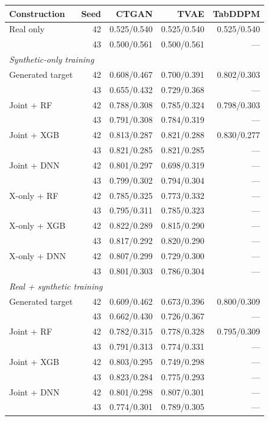 \begin{table}[ht]
\centering
{\small
\setlength{\tabcolsep}{2pt}
\begin{tabular}{lrrrr}
\toprule
Construction & Seed & CTGAN & TVAE & TabDDPM \\
\midrule
Real only & 42 & 0.525/0.540 & 0.525/0.540 & 0.525/0.540 \\
 & 43 & 0.500/0.561 & 0.500/0.561 & --- \\
\midrule
\multicolumn{5}{l}{\textit{Synthetic-only training}} \\
Generated target & 42 & 0.608/0.467 & 0.700/0.391 & 0.802/0.303 \\
 & 43 & 0.655/0.432 & 0.729/0.368 & --- \\
Joint + RF & 42 & 0.788/0.308 & 0.785/0.324 & 0.798/0.303 \\
 & 43 & 0.791/0.308 & 0.784/0.319 & --- \\
Joint + XGB & 42 & 0.813/0.287 & 0.821/0.288 & 0.830/0.277 \\
 & 43 & 0.821/0.285 & 0.821/0.285 & --- \\
Joint + DNN & 42 & 0.801/0.297 & 0.698/0.319 & --- \\
 & 43 & 0.799/0.302 & 0.794/0.304 & --- \\
X-only + RF & 42 & 0.785/0.325 & 0.773/0.332 & --- \\
 & 43 & 0.795/0.311 & 0.785/0.323 & --- \\
X-only + XGB & 42 & 0.822/0.289 & 0.815/0.290 & --- \\
 & 43 & 0.817/0.292 & 0.820/0.290 & --- \\
X-only + DNN & 42 & 0.807/0.299 & 0.729/0.300 & --- \\
 & 43 & 0.801/0.303 & 0.786/0.304 & --- \\
\midrule
\multicolumn{5}{l}{\textit{Real + synthetic training}} \\
Generated target & 42 & 0.609/0.462 & 0.673/0.396 & 0.800/0.309 \\
 & 43 & 0.662/0.430 & 0.726/0.367 & --- \\
Joint + RF & 42 & 0.782/0.315 & 0.778/0.328 & 0.795/0.309 \\
 & 43 & 0.791/0.313 & 0.774/0.331 & --- \\
Joint + XGB & 42 & 0.803/0.295 & 0.749/0.298 & --- \\
 & 43 & 0.823/0.284 & 0.775/0.293 & --- \\
Joint + DNN & 42 & 0.801/0.298 & 0.807/0.301 & --- \\
 & 43 & 0.774/0.301 & 0.789/0.305 & --- \\

\end{tabular}}
\end{table}
